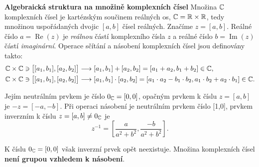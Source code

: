 \wikitextrule
\begin{example}\label{mai:exam048}
  \textbf{Algebraická struktura na množině komplexních čísel}\newline\small
    Množina \(\mathbb{C}\) komplexních čísel je kartézským součinem reálných os, \(\mathbb{C} = 
    \mathbb{R} \times \mathbb{R}\), tedy množinou uspořádaných dvojic \([a, b]\) čísel reálných. 
    Značíme \(z = [a, b]\). Reálné číslo \(a = \operatorname{Re}(z)\) je \emph{reálnou} částí 
    komplexního čísla \(z\) a reálné číslo \(b = \operatorname{Im}(z)\) částí \emph{imaginární}. 
    Operace sčítání a násobení komplexních čísel jsou definovány takto:
    \begin{align*}
      \mathbb{C}\times\mathbb{C}\ni\left[[a_1, b_1],[a_2, b_2]\right] &\longrightarrow
        [a_1, b_1] + [a_2, b_2] = [a_1 + a_2, b_1 + b_2]\in\mathbb{C},                   \\
      \mathbb{C}\times\mathbb{C}\ni\left[[a_1, b_1],[a_2, b_2]\right] &\longrightarrow
        [a_1, b_1] \cdot [a_2, b_2] = 
        [a_1 \cdot a_2 - b_1 \cdot b_2, a_1 \cdot b_2 + a_2 \cdot b_1]\in\mathbb{C}.
    \end{align*}
    
    
    Jejím neutrálním prvkem je číslo \(0_{\mathbb{C}} = [0,0]\), opačným prvkem k číslu \(z = [a, b]\) 
    je \(-z = [-a, - b]\). Při operaci násobení je neutrálním prvkem číslo [1,0], prvkem inverzním 
    k číslu \(z = [a, b] \neq 0_{\mathbb{C}}\) je
    \begin{equation*}
      z^{-1} = \left[\dfrac{a}{a^2 + b^2}, \dfrac{-b}{a^2 + b^2}\right].
    \end{equation*}
    
    K číslu \(0_{\mathbb{C}} = [0,0]\) však inverzní prvek opět neexistuje. Množina komplexních čísel 
    \textbf{není grupou vzhledem k násobení}.
  \normalsize
\end{example}